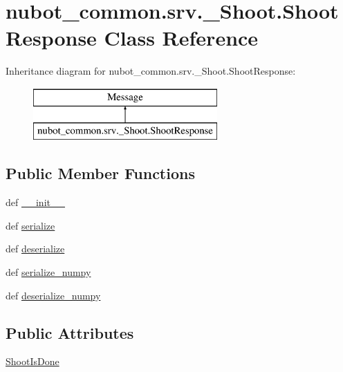 \hypertarget{classnubot__common_1_1srv_1_1__Shoot_1_1ShootResponse}{\section{nubot\-\_\-common.\-srv.\-\_\-\-Shoot.\-Shoot\-Response Class Reference}
\label{classnubot__common_1_1srv_1_1__Shoot_1_1ShootResponse}
}
Inheritance diagram for nubot\-\_\-common.\-srv.\-\_\-\-Shoot.\-Shoot\-Response\-:\begin{figure}[H]
\begin{center}
\leavevmode
\includegraphics[height=2.000000cm]{classnubot__common_1_1srv_1_1__Shoot_1_1ShootResponse}
\end{center}
\end{figure}
\subsection*{Public Member Functions}
\begin{DoxyCompactItemize}
\item 
def \hyperlink{classnubot__common_1_1srv_1_1__Shoot_1_1ShootResponse_a199b9460fa04239376a360ad473855fe}{\-\_\-\-\_\-init\-\_\-\-\_\-}
\item 
def \hyperlink{classnubot__common_1_1srv_1_1__Shoot_1_1ShootResponse_aea76102d2c48b9781b00565f2023a097}{serialize}
\item 
def \hyperlink{classnubot__common_1_1srv_1_1__Shoot_1_1ShootResponse_a955e7f6c286ddcdded06d00a21889784}{deserialize}
\item 
def \hyperlink{classnubot__common_1_1srv_1_1__Shoot_1_1ShootResponse_a989f3038ddeef73fcf9751b9fa6c7f4b}{serialize\-\_\-numpy}
\item 
def \hyperlink{classnubot__common_1_1srv_1_1__Shoot_1_1ShootResponse_a9e07102c6d9e0ba28daaa2c0729a7aba}{deserialize\-\_\-numpy}
\end{DoxyCompactItemize}
\subsection*{Public Attributes}
\begin{DoxyCompactItemize}
\item 
\hyperlink{classnubot__common_1_1srv_1_1__Shoot_1_1ShootResponse_ae79abbfb6fdf49f5de0576d84a1125b4}{Shoot\-Is\-Done}
\end{DoxyCompactItemize}
